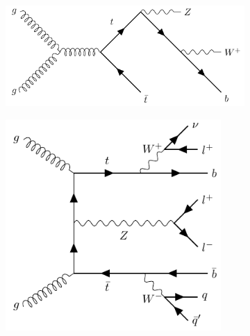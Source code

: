 \begin{figure}[!h]
\begin{subfigure}[b]{0.3\linewidth}
    \caption{}
    \label{ZZ}
  \end{subfigure} 
  \begin{subfigure}[b]{0.3\linewidth}
    \centering
    \vspace*{-2.8cm}
    \includegraphics[width=\textwidth]{ubonn-thesis/Chapters/Chapters_04/Figure/tWZ_Feynman.pdf} 
    \caption{}
    \label{tWZ}
  \end{subfigure}%
  \newline
  \begin{subfigure}[b]{0.3\linewidth}
    \centering
    \includegraphics[width=0.9\textwidth]{ubonn-thesis/Chapters/Chapters_04/Figure/Feynman_ttbarV.pdf} 
    \caption{}
    \label{ttZ}
  \end{subfigure} 
  \begin{subfigure}[b]{0.3\linewidth}
    \centering

\end{subfigure}
\end{figure}
